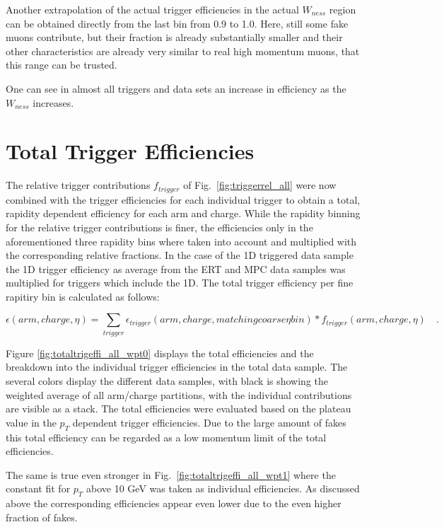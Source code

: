 Another extrapolation of the actual trigger efficiencies in the actual
$W_{ness}$ region can be obtained directly from the last bin from 0.9 to 1.0.
Here, still some fake muons contribute, but their fraction is already
substantially smaller and their other characteristics are already very similar
to real high momentum muons, that this range can be trusted.  

One can see in almost all triggers and data sets an increase in efficiency as
the $W_{ness}$ increases. 

\clearpage
\section{Total Trigger Efficiencies }
The relative trigger contributions $f_{trigger}$ of
Fig.~\ref{fig:triggerrel_all} were now combined with the trigger efficiencies
for each individual trigger to obtain a total, rapidity dependent efficiency for
each arm and charge. While the rapidity binning for the relative trigger
contributions is finer, the efficiencies only in the aforementioned three
rapidity bins where taken into account and multiplied with the corresponding
relative fractions. In the case of the 1D triggered data sample the 1D trigger
efficiency as average from the ERT and MPC data samples was multiplied for
triggers which include the 1D. The total trigger efficiency per fine rapitiry
bin is calculated as follows:

\begin{equation}
\epsilon (arm,charge,\eta) = \sum_{trigger} \epsilon_{trigger}(arm,charge,matching coarse \eta bin) * f_{trigger}(arm,charge,\eta)\quad.
\end{equation}

Figure \ref{fig:totaltrigeffi_all_wpt0} displays the total efficiencies and the
breakdown into the individual trigger efficiencies in the total data sample. The
several colors display the different data samples, with black is showing the
weighted average of all arm/charge partitions, with the individual
contributions are visible as a stack. The total efficiencies were
evaluated based on the plateau value in the $p_T$ dependent trigger
efficiencies. Due to the large amount of fakes this total efficiency can be
regarded as a low momentum limit of the total efficiencies.

The same is true even stronger in Fig.~\ref{fig:totaltrigeffi_all_wpt1} where
the constant fit for $p_T$ above 10 GeV was taken as individual efficiencies. As
discussed above the corresponding efficiencies appear even lower due to the even
higher fraction of fakes. 

